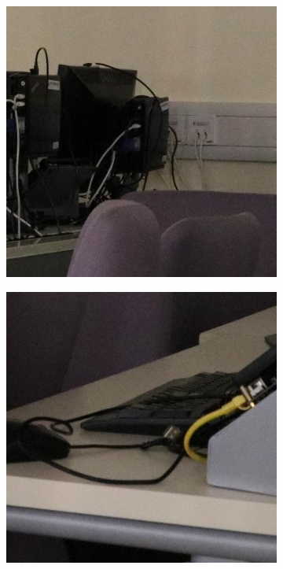 \begin{figure}
\begin{subfigure}[t]{0.19\textwidth}
    \end{subfigure}
    \hfill
    \begin{subfigure}[t]{0.19\textwidth}
        \centering
        \includegraphics[width=1\textwidth]{images/guided/Canon_80D_ISO6400_IMG_0360_part2.JPG}
    \end{subfigure}
    \hfill
    \begin{subfigure}[t]{0.19\textwidth}
        \centering
        \includegraphics[width=1\textwidth]{images/guided/Canon_80D_ISO6400_IMG_0985_part5.JPG}

\end{subfigure}
\end{figure}
